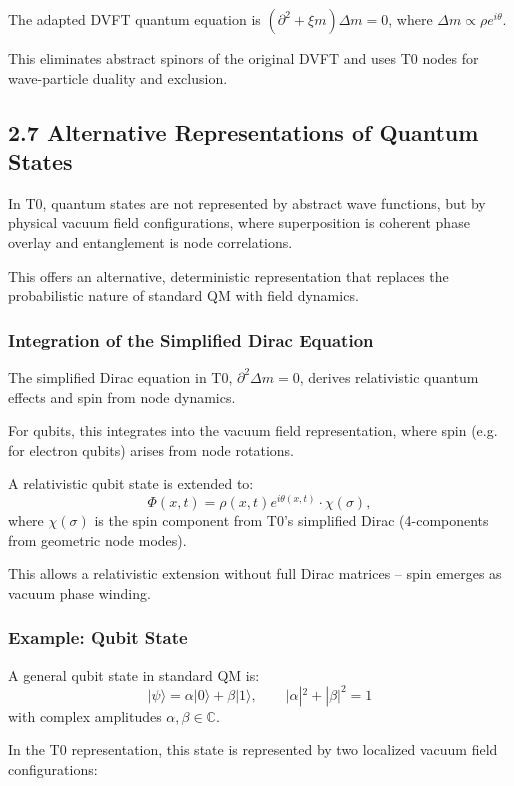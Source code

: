	The adapted DVFT quantum equation is $(\partial^2 + \xi m) \Delta m = 0$, where $\Delta m \propto \rho e^{i\theta}$.
	
	This eliminates abstract spinors of the original DVFT and uses T0 nodes for wave-particle duality and exclusion.
	
	\subsection{2.7 Alternative Representations of Quantum States}
	
	In T0, quantum states are not represented by abstract wave functions, but by physical vacuum field configurations, where superposition is coherent phase overlay and entanglement is node correlations.
	
	This offers an alternative, deterministic representation that replaces the probabilistic nature of standard QM with field dynamics.
	
	\subsubsection{Integration of the Simplified Dirac Equation}
	
	The simplified Dirac equation in T0, $\partial^2 \Delta m = 0$, derives relativistic quantum effects and spin from node dynamics.
	
	For qubits, this integrates into the vacuum field representation, where spin (e.g. for electron qubits) arises from node rotations.
	
	A relativistic qubit state is extended to:
	\[
	\Phi(x,t) = \rho(x,t) e^{i \theta(x,t)} \cdot \chi(\sigma),
	\]
	where $\chi(\sigma)$ is the spin component from T0's simplified Dirac (4-components from geometric node modes).
	
	This allows a relativistic extension without full Dirac matrices – spin emerges as vacuum phase winding.
	
	\subsubsection{Example: Qubit State}
	
	A general qubit state in standard QM is:
	\[
	|\psi\rangle = \alpha |0\rangle + \beta |1\rangle, \qquad |\alpha|^2 + |\beta|^2 = 1
	\]
	with complex amplitudes $\alpha, \beta \in \mathbb{C}$.
	
	In the T0 representation, this state is represented by two localized vacuum field configurations:
	
